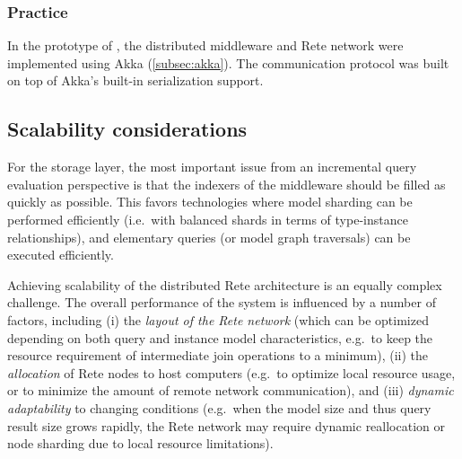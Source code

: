 \subsubsection{Practice}

In the prototype of \iqd{}, the distributed middleware and Rete network were implemented using Akka (\autoref{subsec:akka}). The communication protocol was built on top of Akka's built-in serialization support.



\subsection{Scalability considerations}
For the storage layer, the most important issue from an incremental query evaluation perspective is that the indexers of the middleware should be filled as quickly as possible. This favors technologies where model sharding can be performed efficiently (i.e.\ with balanced shards in terms of type-instance relationships), and elementary queries (or model graph traversals) can be executed efficiently.

Achieving scalability of the distributed Rete architecture is an equally complex challenge. The overall performance of the system is influenced by a number of factors, including (i) the \emph{layout of the Rete network} (which can be optimized depending on both query and instance model characteristics, e.g.\ to keep the resource requirement of intermediate join operations to a minimum), (ii) the \emph{allocation} of Rete nodes to host computers (e.g.\ to optimize local resource usage, or to minimize the amount of remote network communication), and (iii) \emph{dynamic adaptability} to changing conditions (e.g.\ when the model size and thus query result size grows rapidly, the Rete network may require dynamic reallocation or node sharding due to local resource limitations).

